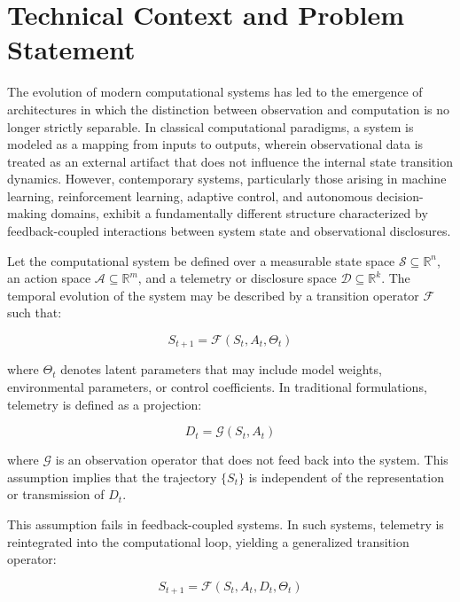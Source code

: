 \section{Technical Context and Problem Statement}

The evolution of modern computational systems has led to the emergence of architectures in which the distinction between observation and computation is no longer strictly separable. In classical computational paradigms, a system is modeled as a mapping from inputs to outputs, wherein observational data is treated as an external artifact that does not influence the internal state transition dynamics. However, contemporary systems, particularly those arising in machine learning, reinforcement learning, adaptive control, and autonomous decision-making domains, exhibit a fundamentally different structure characterized by feedback-coupled interactions between system state and observational disclosures.

Let the computational system be defined over a measurable state space $\mathcal{S} \subseteq \mathbb{R}^n$, an action space $\mathcal{A} \subseteq \mathbb{R}^m$, and a telemetry or disclosure space $\mathcal{D} \subseteq \mathbb{R}^k$. The temporal evolution of the system may be described by a transition operator $\mathcal{F}$ such that:

\begin{equation}
S_{t+1} = \mathcal{F}(S_t, A_t, \Theta_t)
\end{equation}

where $\Theta_t$ denotes latent parameters that may include model weights, environmental parameters, or control coefficients. In traditional formulations, telemetry is defined as a projection:

\begin{equation}
D_t = \mathcal{G}(S_t, A_t)
\end{equation}

where $\mathcal{G}$ is an observation operator that does not feed back into the system. This assumption implies that the trajectory $\{S_t\}$ is independent of the representation or transmission of $D_t$.

This assumption fails in feedback-coupled systems. In such systems, telemetry is reintegrated into the computational loop, yielding a generalized transition operator:

\begin{equation}
S_{t+1} = \mathcal{F}(S_t, A_t, D_t, \Theta_t)
\end{equation}

